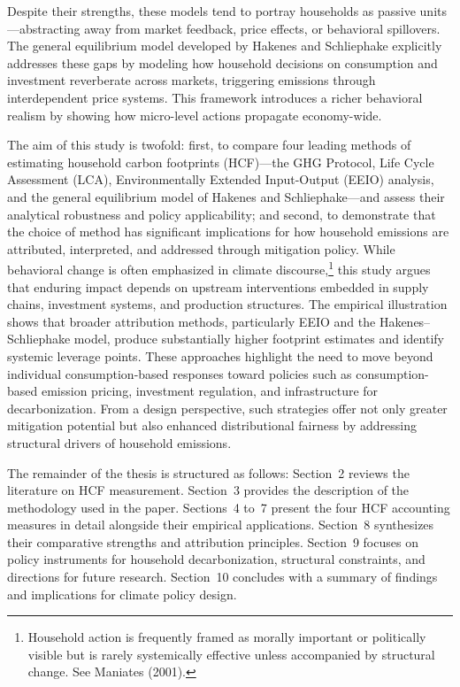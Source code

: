 \documentclass[12pt,a4paper]{article}%
\begin{document}
Despite their strengths, these models tend to portray households as passive units—abstracting away from market feedback, price effects, or behavioral spillovers. The general equilibrium model developed by Hakenes and Schliephake explicitly addresses these gaps by modeling how household decisions on consumption and investment reverberate across markets, triggering emissions through interdependent price systems. This framework introduces a richer behavioral realism by showing how micro-level actions propagate economy-wide.

The aim of this study is twofold: first, to compare four leading methods of estimating household carbon footprints (HCF)—the GHG Protocol, Life Cycle Assessment (LCA), Environmentally Extended Input-Output (EEIO) analysis, and the general equilibrium model of Hakenes and Schliephake—and assess their analytical robustness and policy applicability; and second, to demonstrate that the choice of method has significant implications for how household emissions are attributed, interpreted, and addressed through mitigation policy. While behavioral change is often emphasized in climate discourse,\footnote{Household action is frequently framed as morally important or politically visible but is rarely systemically effective unless accompanied by structural change. See Maniates (2001).} this study argues that enduring impact depends on upstream interventions embedded in supply chains, investment systems, and production structures. The empirical illustration shows that broader attribution methods, particularly EEIO and the Hakenes–Schliephake model, produce substantially higher footprint estimates and identify systemic leverage points. These approaches highlight the need to move beyond individual consumption-based responses toward policies such as consumption-based emission pricing, investment regulation, and infrastructure for decarbonization. From a design perspective, such strategies offer not only greater mitigation potential but also enhanced distributional fairness by addressing structural drivers of household emissions.

The remainder of the thesis is structured as follows: Section~2 reviews the literature on HCF measurement. Section~3 provides the description of the methodology used in the paper. Sections~4 to~7 present the four HCF accounting measures in detail alongside their empirical applications. Section~8 synthesizes their comparative strengths and attribution principles. Section~9 focuses on policy instruments for household decarbonization, structural constraints, and directions for future research. Section~10 concludes with a summary of findings and implications for climate policy design.
\end{document}
